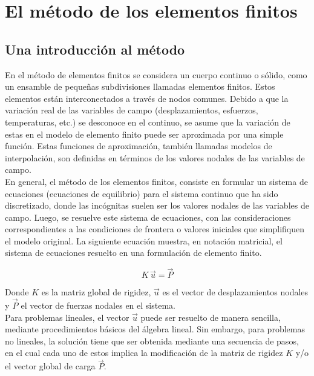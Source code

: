 \section{El método de los elementos finitos}

\subsection{Una introducción al método}

En el método de elementos finitos se considera un cuerpo continuo o sólido, como un ensamble de pequeñas 
subdivisiones llamadas elementos finitos. Estos elementos están interconectados a través de nodos comunes. 
Debido a que la variación real de las variables de campo (desplazamientos, esfuerzos, temperaturas, etc.) 
se desconoce en el continuo, se asume que la variación de estas en el modelo de elemento finito puede ser 
aproximada por una simple función. Estas funciones de aproximación, también llamadas modelos de interpolación, 
son definidas en términos de los valores nodales de las variables de campo.\\

En general, el método de los elementos finitos, consiste en formular un sistema de ecuaciones 
(ecuaciones de equilibrio) para el sistema continuo que ha sido discretizado, donde las incógnitas 
suelen ser los valores nodales de las variables de campo. Luego, se resuelve este sistema de ecuaciones, 
con las consideraciones correspondientes a las condiciones de frontera o valores iniciales que simplifiquen 
el modelo original. La siguiente ecuación muestra, en notación matricial, el sistema de ecuaciones resuelto 
en una formulación de elemento finito.

\begin{equation} \label{eq:fem_simple}
K\,\vec{u} = \vec{P}
\end{equation}

Donde $K$ es la matriz global de rigidez, $\vec{u}$ es el vector de desplazamientos nodales y $\vec{P}$ el 
vector de fuerzas nodales en el sistema.\\

Para problemas lineales, el vector $\vec{u}$ puede ser resuelto de manera sencilla, mediante 
procedimientos básicos del álgebra lineal. Sin embargo, para problemas no lineales, la solución 
tiene que ser obtenida mediante una secuencia de pasos, en el cual cada uno de estos implica la 
modificación de la matriz de rigidez $K$ y/o el vector global de carga $\vec{P}$.\\

